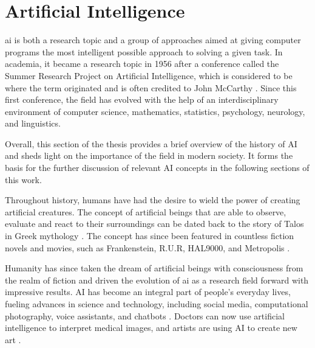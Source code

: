 \label{sec:2_background_theory}


\section{Artificial Intelligence}

\gls{ai} is both a research topic and a group of approaches aimed at giving computer programs the most intelligent possible approach to solving a given task. In academia, it became a research topic in 1956 after a conference called the Summer Research Project on Artificial Intelligence, which is considered to be where the term originated and is often credited to John McCarthy \cite{mccarthyProposalDartmouthSummer2006, andresenJohnMcCarthyFather2002}. Since this first conference, the field has evolved with the help of an interdisciplinary environment of computer science, mathematics, statistics, psychology, neurology, and linguistics.

Overall, this section of the thesis provides a brief overview of the history of AI and sheds light on the importance of the field in modern society. It forms the basis for the further discussion of relevant AI concepts in the following sections of this work.

Throughout history, humans have had the desire to wield the power of creating artificial creatures. The concept of artificial beings that are able to observe, evaluate and react to their surroundings can be dated back to the story of Talos in Greek mythology \cite{universityAncientMythsReveal2019}. The concept has since been featured in countless fiction novels and movies, such as Frankenstein, R.U.R, HAL9000, and Metropolis \cite{shelleyFrankensteinModernPrometheus1992, capekRossumUniversalRobots, kubrick2001SpaceOdyssey1969, langMetropolis1927a}. 

Humanity has since taken the dream of artificial beings with consciousness from the realm of fiction and driven the evolution of \gls{ai} as a research field forward with impressive results. 
AI has become an integral part of people's everyday lives, fueling advances in science and technology, including social media, computational photography, voice assistants, and chatbots \cite{barbastathisUseDeepLearning, hoyAlexaSiriCortana2018, biswasRoleChatGPT2023}. Doctors can now use artificial intelligence to interpret medical images, and artists are using AI to create new art \cite{wangMachineLearningRadiology2012, thrallArtificialIntelligenceMachine2018}.


